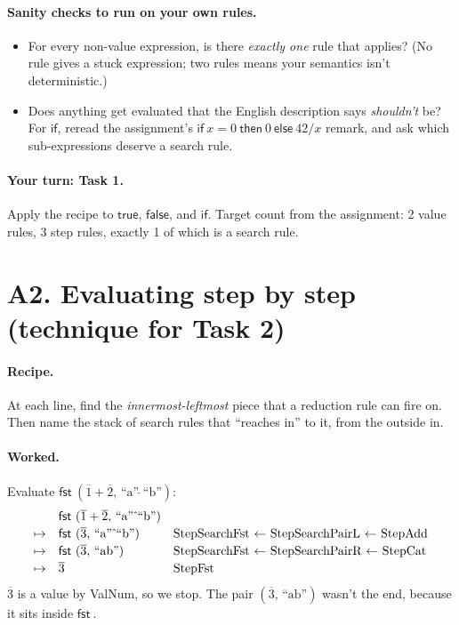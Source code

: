 \documentclass[11pt]{article}
\newcommand{\PAIR}[2]{(#1,\, #2)}
\newcommand{\FST}[1]{\mathsf{fst}\ #1}
\newcommand{\num}[1]{\overline{#1}}
\newcommand{\str}[1]{\text{``#1''}}
\begin{document}
\paragraph{Sanity checks to run on your own rules.}
\begin{itemize}
  \item For every non-value expression, is there \emph{exactly one} rule
        that applies? (No rule gives a stuck expression; two rules
        means your semantics isn't deterministic.)
  \item Does anything get evaluated that the English description says
        \emph{shouldn't} be? For $\mathsf{if}$, reread the assignment's
        $\mathsf{if}\ x = 0\ \mathsf{then}\ 0\ \mathsf{else}\ 42/x$ remark,
        and ask which sub-expressions deserve a search rule.
\end{itemize}

\paragraph{Your turn: Task 1.} Apply the recipe to $\mathsf{true}$,
$\mathsf{false}$, and $\mathsf{if}$. Target count from the assignment: 2 value
rules, 3 step rules, exactly 1 of which is a search rule.

\section*{A2. Evaluating step by step \hfill (technique for Task 2)}

\paragraph{Recipe.} At each line, find the \emph{innermost-leftmost} piece
that a reduction rule can fire on. Then name the stack of search rules that
``reaches in'' to it, from the outside in.

\paragraph{Worked.} Evaluate $\FST{\PAIR{\num1+\num2}{\str{a}\,\hat{}\,\str{b}}}$:
\[
\begin{array}{r l l}
  & \FST{\PAIR{\num1+\num2}{\str{a}\,\hat{}\,\str{b}}} & \\[2pt]
  \mapsto & \FST{\PAIR{\num3}{\str{a}\,\hat{}\,\str{b}}}
          & \text{StepSearchFst $\leftarrow$ StepSearchPairL $\leftarrow$ StepAdd}\\[2pt]
  \mapsto & \FST{\PAIR{\num3}{\str{ab}}}
          & \text{StepSearchFst $\leftarrow$ StepSearchPairR $\leftarrow$ StepCat}\\[2pt]
  \mapsto & \num3
          & \text{StepFst}
\end{array}
\]
$\num3$ is a value by ValNum, so we stop. The pair $\PAIR{\num3}{\str{ab}}$
wasn't the end, because it sits inside $\FST{}$.
\end{document}
